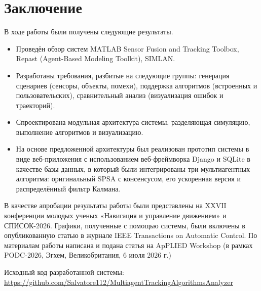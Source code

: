 \section*{Заключение}

В ходе работы были получены следующие результаты.

\begin{itemize}
    \item Проведён обзор систем MATLAB Sensor Fusion and Tracking Toolbox, Repast (Agent-Based Modeling Toolkit), SIMLAN.
    
    \item Разработаны требования, разбитые на  следующие группы: генерация сценариев (сенсоры, объекты, помехи), поддержка алгоритмов (встроенных и пользовательских), сравнительный анализ (визуализация ошибок и траекторий).
    
    \item Спроектирована модульная архитектура системы, разделяющая симуляцию, выполнение алгоритмов и визуализацию.
    
    \item На основе предложенной архитектуры был реализован прототип системы в виде веб-приложения с использованием веб-фреймворка Django и SQLite в качестве базы данных, в который были интегрированы три мультиагентных алгоритма: оригинальный SPSA с консенсусом, его ускоренная версия и распределённый фильтр Калмана.

\end{itemize}

В качестве апробации результаты работы были представлены на XXVII конференции молодых ученых «Навигация и управление движением» и СПИСОК-2026. Графики, полученные с помощью системы, были включены в опубликованную статью в журнале IEEE Transactions on Automatic Control. По материалам работы написана и подана статья на ApPLIED Workshop (в рамках PODC-2026, Эгхем, Великобритания, 6 июля 2026 г.)

Исходный код разработанной системы: \url{https://github.com/Salvatore112/MultiagentTrackingAlgorithmsAnalyzer}